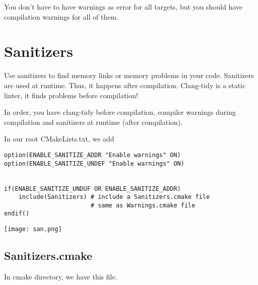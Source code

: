 You don't have to have warnings as error for all targets, but you should have compilation warnings for all of them.

\section{Sanitizers}

Use sanitizers to find memory links or memory problems in your code. Sanitizers are used at runtime. 
Thus, it happens after compilation. Clang-tidy is a static linter, it finds problems before compilation!  

In order, you have clang-tidy before compilation, 
compiler warnings during compilation and sanitizers at runtime (after compilation).

In our root CMakeLists.txt, we add

\begin{verbatim}
option(ENABLE_SANITIZE_ADDR "Enable warnings" ON)
option(ENABLE_SANITIZE_UNDEF "Enable warnings" ON)


if(ENABLE_SANITIZE_UNDUF OR ENABLE_SANITIZE_ADDR)
    include(Sanitizers) # include a Sanitizers.cmake file
                        # same as Warnings.cmake file
endif()

\end{verbatim}

\begin{center}
    \texttt{[image: san.png]}
\end{center}


\subsection{Sanitizers.cmake}

In cmake directory, we have this file.


